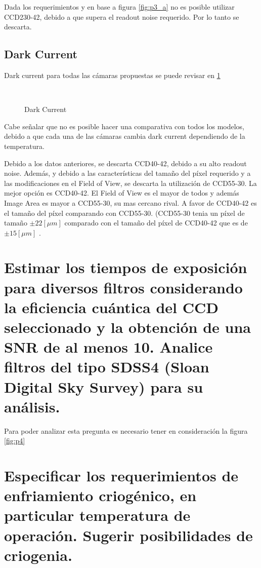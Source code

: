 \documentclass[a4paper,10pt]{article}
\begin{document}
Dada los requerimientos y en base a figura \ref{fig:p3_a}  no es posible
utilizar CCD230-42, debido a que supera el readout noise requerido. Por lo
tanto se descarta. 

\subsection{Dark Current}
Dark current para todas las cámaras propuestas se puede revisar en \ref{fig:p3_c}
\begin{figure}[ht!]
  \centering
  ~ 
  \caption{Dark Current}
  \label{fig:p3_c}
\end{figure}

Cabe señalar que no es posible hacer una comparativa con todos los modelos,
debido a que cada una de las cámaras cambia dark current dependiendo de la
temperatura.

Debido a los datos anteriores, se descarta CCD40-42, debido a su alto readout
noise. Además, y debido a las características del tamaño del píxel requerido y
a las modificaciones en el Field of View, se descarta la utilización de
CCD55-30. La mejor opción es CCD40-42. El Field of View es el mayor de todos y
además Image Area es mayor a CCD55-30, su mas cercano rival. A favor de
CCD40-42 es el tamaño del píxel comparando con CCD55-30. (CCD55-30 tenia un
píxel de tamaño $\pm 22 [\mu m]$ comparado con el tamaño del píxel de CCD40-42
que es de $\pm 15 [\mu m]$ .
\section{Estimar los tiempos de exposición para diversos filtros considerando la
eficiencia cuántica del CCD seleccionado y la obtención de una SNR de al menos
10. Analice filtros del tipo SDSS4 (Sloan Digital Sky Survey) para su análisis.}
Para poder analizar esta pregunta es necesario tener en consideración la figura \ref{fig:p4}


\section{Especificar los requerimientos de enfriamiento criogénico, en particular
temperatura de operación. Sugerir posibilidades de criogenia.}
\end{document}
